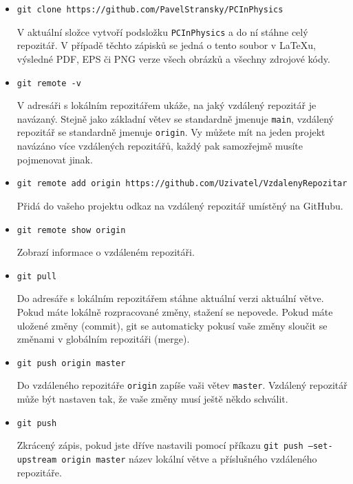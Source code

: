\documentclass[a4paper,11pt,twoside]{article}
\def\code#1{\textnormal{\texttt{#1}}}
\theoremstyle{red}
\theoremstyle{green}
\begin{document}
    \begin{itemize}
    \item \code{git clone https://github.com/PavelStransky/PCInPhysics}
    
        V aktuální složce vytvoří podsložku \code{PCInPhysics} a do ní stáhne celý repozitář.
        V případě těchto zápisků se jedná o tento soubor v {\LaTeX}u,
        výsledné PDF, EPS či PNG verze všech obrázků a všechny zdrojové kódy.

    \item \code{git remote -v}
    
        V adresáři s lokálním repozitářem ukáže, na jaký vzdálený repozitář je navázaný.
        Stejně jako základní větev se standardně jmenuje \code{main}, vzdálený repozitář se standardně jmenuje \code{origin}.
        Vy můžete mít na jeden projekt navázáno více vzdálených repozitářů, každý pak samozřejmě musíte pojmenovat jinak.

    \item \code{git remote add origin https://github.com/Uzivatel/VzdalenyRepozitar}
    
        Přidá do vašeho projektu odkaz na vzdálený repozitář umístěný na GitHubu.

    \item \code{git remote show origin}
    
        Zobrazí informace o vzdáleném repozitáři.

    \item \code{git pull}
    
        Do adresáře s lokálním repozitářem stáhne aktuální verzi aktuální větve.
        Pokud máte lokálně rozpracované změny, stažení se nepovede.
        Pokud máte uložené změny (commit), git se automaticky pokusí vaše změny sloučit se změnami v globálním repozitáři (merge).
        
    \item \code{git push origin master}
    
        Do vzdáleného repozitáře \code{origin} zapíše vaši větev \code{master}.
        Vzdálený repozitář může být nastaven tak, že vaše změny musí ještě někdo schválit.

    \item \code{git push}

        Zkrácený zápis, pokud jste dříve nastavili pomocí příkazu \code{git push --set-upstream origin master} název lokální větve a příslušného vzdáleného repozitáře.

    \end{itemize}
\end{document}
